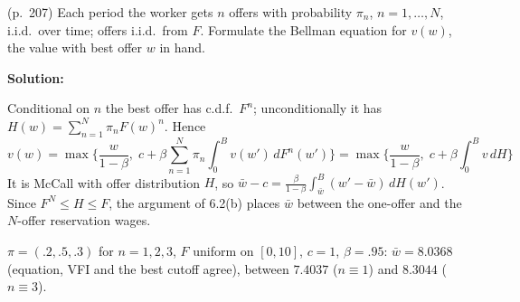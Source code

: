 \documentclass[12pt, letterpaper]{article}
\newcommand{\wb}{\bar w}
\begin{document}
\begin{tcolorbox}[oddbox,title={Exercise 6.3 \quad A Random Number of Offers per Period}]
\begin{tcolorbox}[questionbox]
(p.~207) Each period the worker gets $n$ offers with probability $\pi_n$, $n=1,\dots,N$, i.i.d.\ over time;
offers i.i.d.\ from $F$. Formulate the Bellman equation for $v(w)$, the value with best offer $w$ in hand.
\end{tcolorbox}

\textbf{Solution:}

Conditional on $n$ the best offer has c.d.f.\ $F^n$; unconditionally it has
$H(w)=\sum_{n=1}^N\pi_nF(w)^n$. Hence
\[
\boxed{v(w)=\max\Big\{\frac{w}{1-\beta},\;c+\beta\sum_{n=1}^N\pi_n\int_0^Bv(w')\,dF^n(w')\Big\}}
=\max\Big\{\frac{w}{1-\beta},\;c+\beta\int_0^Bv\,dH\Big\}
\]
It is McCall with offer distribution $H$, so $\wb-c=\frac{\beta}{1-\beta}\int_{\wb}^B(w'-\wb)\,dH(w')$. Since
$F^N\le H\le F$, the argument of 6.2(b) places $\wb$ between the one-offer and the $N$-offer reservation
wages.

\begin{tcolorbox}[databox]
$\pi=(.2,.5,.3)$ for $n=1,2,3$, $F$ uniform on $[0,10]$, $c=1$, $\beta=.95$: $\wb=8.0368$ (equation, VFI and
the best cutoff agree), between $7.4037$ ($n\equiv1$) and $8.3044$ ($n\equiv3$).
\end{tcolorbox}
\end{tcolorbox}
\end{document}
